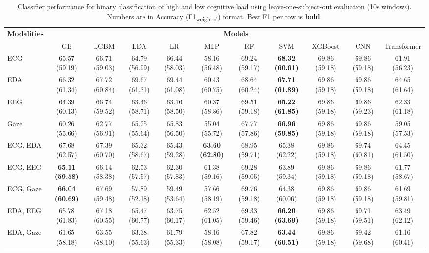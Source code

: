 \begin{table}[!htbp]
  \centering
  \scriptsize
  \setlength{\tabcolsep}{3pt}
  \caption{Classifier performance for binary classification of high and low cognitive load using leave-one-subject-out evaluation (10s windows). Numbers are in Accuracy (F1\textsubscript{weighted}) format. Best F1 per row is \textbf{bold}.}
  \label{tab:results_loso_10s}
  \begin{tabular}{lcccccccccc}
    \toprule
    \textbf{Modalities} & \multicolumn{10}{c}{\textbf{Models}} \\
    \cmidrule(l){2-11}
    & GB & LGBM & LDA & LR & MLP & RF & SVM & XGBoost & CNN & Transformer \\
    \midrule
    ECG & 65.57 (59.19) & 66.71 (59.03) & 64.79 (56.99) & 66.44 (58.03) & 58.16 (56.48) & 69.24 (59.17) & \textbf{68.32 (60.61)} & 69.86 (59.18) & 69.86 (59.18) & 61.91 (56.23) \\
    EDA & 66.32 (61.34) & 67.72 (60.84) & 69.67 (61.31) & 69.44 (61.08) & 60.43 (60.75) & 68.64 (60.24) & \textbf{67.71 (61.89)} & 69.86 (59.18) & 69.86 (59.18) & 64.65 (61.64) \\
    EEG & 64.39 (60.13) & 66.74 (59.52) & 63.46 (58.71) & 63.16 (58.50) & 60.37 (58.86) & 69.51 (59.18) & \textbf{65.22 (61.85)} & 69.86 (59.18) & 69.86 (59.23) & 62.33 (61.18) \\
    Gaze & 60.26 (55.66) & 62.77 (56.91) & 65.25 (55.64) & 65.83 (56.50) & 55.04 (55.72) & 67.77 (57.86) & \textbf{66.96 (59.85)} & 69.86 (59.18) & 69.86 (59.18) & 59.05 (57.53) \\
    \midrule
    ECG, EDA & 67.68 (62.57) & 67.39 (60.70) & 65.32 (58.67) & 65.43 (59.28) & \textbf{63.60 (62.80)} & 68.95 (59.71) & 65.38 (62.22) & 69.86 (59.18) & 69.74 (60.81) & 64.45 (61.50) \\
    ECG, EEG & \textbf{65.11 (59.58)} & 66.14 (58.38) & 62.53 (57.57) & 62.30 (57.83) & 61.38 (59.16) & 69.28 (59.05) & 63.89 (59.34) & 69.86 (59.18) & 69.86 (59.18) & 61.77 (58.67) \\
    ECG, Gaze & \textbf{66.04 (60.69)} & 67.69 (59.48) & 57.89 (52.18) & 59.49 (53.64) & 57.66 (58.19) & 69.76 (59.18) & 64.38 (60.06) & 69.86 (59.18) & 69.86 (59.18) & 61.69 (59.81) \\
    EDA, EEG & 65.78 (61.83) & 67.18 (60.55) & 65.47 (60.77) & 63.75 (60.17) & 62.52 (61.05) & 69.33 (59.46) & \textbf{66.20 (63.69)} & 69.86 (59.18) & 69.71 (59.51) & 63.49 (62.12) \\
    EDA, Gaze & 61.65 (58.18) & 63.55 (58.10) & 63.38 (55.63) & 61.79 (55.33) & 58.16 (58.08) & 67.82 (59.17) & \textbf{63.44 (60.51)} & 69.86 (59.18) & 69.42 (59.68) & 61.16 (60.41) \\

\end{tabular}
\end{table}
